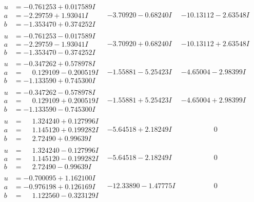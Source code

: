 \documentclass[1p]{elsarticle_modified}
\theoremstyle{definition}
\begin{document}
$$\begin{array}{c|c|c}
\begin{aligned}
u &= -0.761253 + 0.017589 I \\
a &= -2.29759 + 1.93041 I \\
b &= -1.353470 + 0.374252 I\end{aligned}
 & -3.70920 - 0.68240 I & -10.13112 - 2.63548 I \\ \hline\begin{aligned}
u &= -0.761253 - 0.017589 I \\
a &= -2.29759 - 1.93041 I \\
b &= -1.353470 - 0.374252 I\end{aligned}
 & -3.70920 + 0.68240 I & -10.13112 + 2.63548 I \\ \hline\begin{aligned}
u &= -0.347262 + 0.578978 I \\
a &= \phantom{-}0.129109 - 0.200519 I \\
b &= -1.133590 + 0.745300 I\end{aligned}
 & -1.55881 - 5.25423 I & -4.65004 - 2.98399 I \\ \hline\begin{aligned}
u &= -0.347262 - 0.578978 I \\
a &= \phantom{-}0.129109 + 0.200519 I \\
b &= -1.133590 - 0.745300 I\end{aligned}
 & -1.55881 + 5.25423 I & -4.65004 + 2.98399 I \\ \hline\begin{aligned}
u &= \phantom{-}1.324240 + 0.127996 I \\
a &= \phantom{-}1.145120 + 0.199282 I \\
b &= \phantom{-}2.72490 + 0.99639 I\end{aligned}
 & -5.64518 + 2.18249 I & \phantom{-0.000000 } 0 \\ \hline\begin{aligned}
u &= \phantom{-}1.324240 - 0.127996 I \\
a &= \phantom{-}1.145120 - 0.199282 I \\
b &= \phantom{-}2.72490 - 0.99639 I\end{aligned}
 & -5.64518 - 2.18249 I & \phantom{-0.000000 } 0 \\ \hline\begin{aligned}
u &= -0.700095 + 1.162100 I \\
a &= -0.976198 + 0.126169 I \\
b &= \phantom{-}1.122560 - 0.323129 I\end{aligned}
 & -12.33890 - 1.47775 I & \phantom{-0.000000 } 0 \\ \hline\begin{aligned}

\end{aligned}
\end{array}$$
\end{document}
